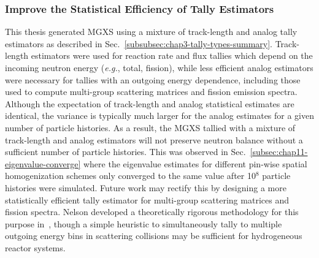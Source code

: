 

\subsubsection{Improve the Statistical Efficiency of Tally Estimators}
\label{subsubsec:chap12-tally-estimators}

This thesis generated \ac{MGXS} using a mixture of track-length and analog tally estimators as described in Sec.~\ref{subsubsec:chap3-tally-types-summary}. Track-length estimators were used for reaction rate and flux tallies which depend on the incoming neutron energy (\textit{e.g.}, total, fission), while less efficient analog estimators were necessary for tallies with an outgoing energy dependence, including those used to compute multi-group scattering matrices and fission emission spectra. Although the expectation of track-length and analog statistical estimates are identical, the variance is typically much larger for the analog estimates for a given number of particle histories. As a result, the \ac{MGXS} tallied with a mixture of track-length and analog estimators will not preserve neutron balance without a sufficient number of particle histories. This was observed in Sec.~\ref{subsec:chap11-eigenvalue-converge} where the eigenvalue estimates for different pin-wise spatial homogenization schemes only converged to the same value after 10$^{8}$ particle histories were simulated. Future work may rectify this by designing a more statistically efficient tally estimator for multi-group scattering matrices and fission spectra. Nelson developed a theoretically rigorous methodology for this purpose in~\cite{nelson2014improved}, though a simple heuristic to simultaneously tally to multiple outgoing energy bins in scattering collisions may be sufficient for hydrogeneous reactor systems.


